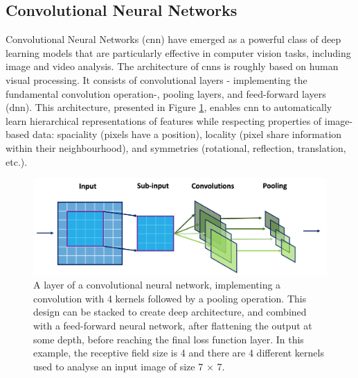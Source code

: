 \subsection{Convolutional Neural Networks}
Convolutional Neural Networks (\gls{cnn}) \cite{NIPS198953c3bce6, NIPS2012_c399862d} have emerged as a powerful class of deep learning models that are particularly effective in computer vision tasks, including image and video analysis. The architecture of \gls{cnn}s is roughly based on human visual processing. It consists of convolutional layers - implementing the fundamental convolution operation-, pooling layers, and feed-forward layers (\gls{dnn}). This architecture, presented in Figure \ref{fig:cnnDesign}, enables \gls{cnn} to automatically learn hierarchical representations of features while respecting properties of image-based data: spaciality (pixels have a position), locality (pixel share information within their neighbourhood), and symmetries (rotational, reflection, translation, etc.).

\begin{figure}[h!]
    \center
    \includegraphics[scale=0.5]{Images/ML/cnn.png}
    \caption{A layer of a convolutional neural network, implementing a convolution with 4 kernels followed by a pooling operation. This design can be stacked to create deep architecture, and combined with a feed-forward neural network, after flattening the output at some depth, before reaching the final loss function layer. In this example, the receptive field size is 4 and there are 4 different kernels used to analyse an input image of size 7 $\times$ 7.} 
    \label{fig:cnnDesign}
\end{figure}

